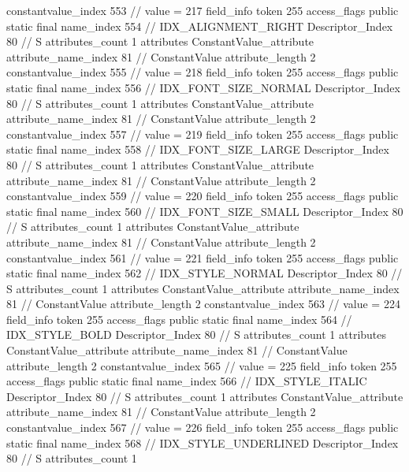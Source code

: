 {{{{{{{					constantvalue_index	553		// value = 217
				}
				}
			}
			field_info {
				token	255
				access_flags	public static final
				name_index	554		// IDX_ALIGNMENT_RIGHT
				Descriptor_Index	80		// S
				attributes_count	1
				attributes {
				ConstantValue_attribute {
					attribute_name_index	81		// ConstantValue
					attribute_length	2
					constantvalue_index	555		// value = 218
				}
				}
			}
			field_info {
				token	255
				access_flags	public static final
				name_index	556		// IDX_FONT_SIZE_NORMAL
				Descriptor_Index	80		// S
				attributes_count	1
				attributes {
				ConstantValue_attribute {
					attribute_name_index	81		// ConstantValue
					attribute_length	2
					constantvalue_index	557		// value = 219
				}
				}
			}
			field_info {
				token	255
				access_flags	public static final
				name_index	558		// IDX_FONT_SIZE_LARGE
				Descriptor_Index	80		// S
				attributes_count	1
				attributes {
				ConstantValue_attribute {
					attribute_name_index	81		// ConstantValue
					attribute_length	2
					constantvalue_index	559		// value = 220
				}
				}
			}
			field_info {
				token	255
				access_flags	public static final
				name_index	560		// IDX_FONT_SIZE_SMALL
				Descriptor_Index	80		// S
				attributes_count	1
				attributes {
				ConstantValue_attribute {
					attribute_name_index	81		// ConstantValue
					attribute_length	2
					constantvalue_index	561		// value = 221
				}
				}
			}
			field_info {
				token	255
				access_flags	public static final
				name_index	562		// IDX_STYLE_NORMAL
				Descriptor_Index	80		// S
				attributes_count	1
				attributes {
				ConstantValue_attribute {
					attribute_name_index	81		// ConstantValue
					attribute_length	2
					constantvalue_index	563		// value = 224
				}
				}
			}
			field_info {
				token	255
				access_flags	public static final
				name_index	564		// IDX_STYLE_BOLD
				Descriptor_Index	80		// S
				attributes_count	1
				attributes {
				ConstantValue_attribute {
					attribute_name_index	81		// ConstantValue
					attribute_length	2
					constantvalue_index	565		// value = 225
				}
				}
			}
			field_info {
				token	255
				access_flags	public static final
				name_index	566		// IDX_STYLE_ITALIC
				Descriptor_Index	80		// S
				attributes_count	1
				attributes {
				ConstantValue_attribute {
					attribute_name_index	81		// ConstantValue
					attribute_length	2
					constantvalue_index	567		// value = 226
				}
				}
			}
			field_info {
				token	255
				access_flags	public static final
				name_index	568		// IDX_STYLE_UNDERLINED
				Descriptor_Index	80		// S
				attributes_count	1
}}}}}
